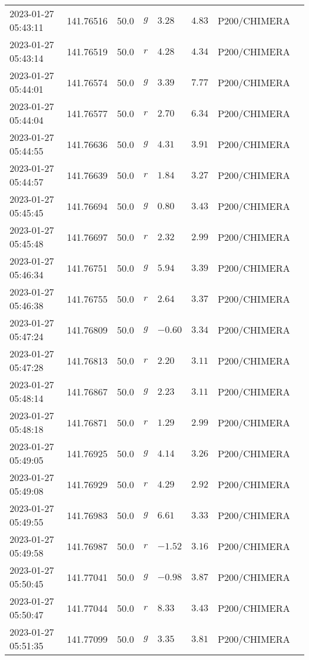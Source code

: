 \documentclass{nature_plusfigure}
\begin{document}
\begin{supplement}
\begin{center}
\begin{longtable}{llllllll}
2023-01-27 05:43:11 & 141.76516 & 50.0 & $g$ & $3.28$ & $4.83$ & P200/CHIMERA &  \\ 
2023-01-27 05:43:14 & 141.76519 & 50.0 & $r$ & $4.28$ & $4.34$ & P200/CHIMERA &  \\ 
2023-01-27 05:44:01 & 141.76574 & 50.0 & $g$ & $3.39$ & $7.77$ & P200/CHIMERA &  \\ 
2023-01-27 05:44:04 & 141.76577 & 50.0 & $r$ & $2.70$ & $6.34$ & P200/CHIMERA &  \\ 
2023-01-27 05:44:55 & 141.76636 & 50.0 & $g$ & $4.31$ & $3.91$ & P200/CHIMERA &  \\ 
2023-01-27 05:44:57 & 141.76639 & 50.0 & $r$ & $1.84$ & $3.27$ & P200/CHIMERA &  \\ 
2023-01-27 05:45:45 & 141.76694 & 50.0 & $g$ & $0.80$ & $3.43$ & P200/CHIMERA &  \\ 
2023-01-27 05:45:48 & 141.76697 & 50.0 & $r$ & $2.32$ & $2.99$ & P200/CHIMERA &  \\ 
2023-01-27 05:46:34 & 141.76751 & 50.0 & $g$ & $5.94$ & $3.39$ & P200/CHIMERA &  \\ 
2023-01-27 05:46:38 & 141.76755 & 50.0 & $r$ & $2.64$ & $3.37$ & P200/CHIMERA &  \\ 
2023-01-27 05:47:24 & 141.76809 & 50.0 & $g$ & $-0.60$ & $3.34$ & P200/CHIMERA &  \\ 
2023-01-27 05:47:28 & 141.76813 & 50.0 & $r$ & $2.20$ & $3.11$ & P200/CHIMERA &  \\ 
2023-01-27 05:48:14 & 141.76867 & 50.0 & $g$ & $2.23$ & $3.11$ & P200/CHIMERA &  \\ 
2023-01-27 05:48:18 & 141.76871 & 50.0 & $r$ & $1.29$ & $2.99$ & P200/CHIMERA &  \\ 
2023-01-27 05:49:05 & 141.76925 & 50.0 & $g$ & $4.14$ & $3.26$ & P200/CHIMERA &  \\ 
2023-01-27 05:49:08 & 141.76929 & 50.0 & $r$ & $4.29$ & $2.92$ & P200/CHIMERA &  \\ 
2023-01-27 05:49:55 & 141.76983 & 50.0 & $g$ & $6.61$ & $3.33$ & P200/CHIMERA &  \\ 
2023-01-27 05:49:58 & 141.76987 & 50.0 & $r$ & $-1.52$ & $3.16$ & P200/CHIMERA &  \\ 
2023-01-27 05:50:45 & 141.77041 & 50.0 & $g$ & $-0.98$ & $3.87$ & P200/CHIMERA &  \\ 
2023-01-27 05:50:47 & 141.77044 & 50.0 & $r$ & $8.33$ & $3.43$ & P200/CHIMERA &  \\ 
2023-01-27 05:51:35 & 141.77099 & 50.0 & $g$ & $3.35$ & $3.81$ & P200/CHIMERA &  \\ 

\end{longtable}
\end{center}
\end{supplement}
\end{document}
